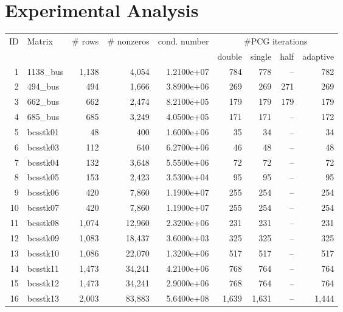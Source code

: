 \section{Experimental Analysis}
\label{2017-adaptive-block-jacobi:sec:experiments}

\begin{table}
\begin{center}
\scriptsize
\begin{tabular}{rlrrr||rrrr}
\hline
\hline

\hline
ID & Matrix & \# rows & \# nonzeros & cond. number & \multicolumn{4}{c}{\#PCG 
iterations}\\
& & & & & double & single & half & adaptive\\
\hline
1 &  1138\_bus & 1,138 &     4,054 & 1.2100e+07 & 784 &  778 &  -- &  782 \\
  2 &   494\_bus &  494 &     1,666 & 3.8900e+06 & 269 &  269 &  271 &  269 \\
  3 &   662\_bus &  662 &     2,474 & 8.2100e+05 & 179 &  179 &  179 &  179 \\
  4 &   685\_bus &  685 &     3,249 & 4.0500e+05 & 171 &  171 &  -- &  172 \\
  5 &   bcsstk01 &   48 &      400 & 1.6000e+06 &  35 &   34 &  -- &   34 \\
  6 &   bcsstk03 &  112 &      640 & 6.2700e+06 &  46 &   48 &  -- &   48 \\
  7 &   bcsstk04 &  132 &     3,648 & 5.5500e+06 &  72 &   72 &  -- &   72 \\
  8 &   bcsstk05 &  153 &     2,423 & 3.5300e+04 &  95 &   95 &  -- &   95 \\
  9 &   bcsstk06 &  420 &     7,860 & 1.1900e+07 & 255 &  254 &  -- &  254 \\
 10 &   bcsstk07 &  420 &     7,860 & 1.1900e+07 & 255 &  254 &  -- &  254 \\
 11 &   bcsstk08 & 1,074 &    12,960 & 2.3200e+06 & 231 &  231 &  -- &  231 \\
 12 &   bcsstk09 & 1,083 &    18,437 & 3.6000e+03 & 325 &  325 &  -- &  325 \\
 13 &   bcsstk10 & 1,086 &    22,070 & 1.3200e+06 & 517 &  517 &  -- &  517 \\
 14 &   bcsstk11 & 1,473 &    34,241 & 4.2100e+06 & 768 &  764 &  -- &  764 \\
 15 &   bcsstk12 & 1,473 &    34,241 & 2.9000e+06 & 768 &  764 &  -- &  764 \\
 16 &   bcsstk13 & 2,003 &    83,883 & 5.6400e+08 &1,639 & 1,631 &  -- & 1,444 

\end{tabular}
\end{center}
\end{table}

